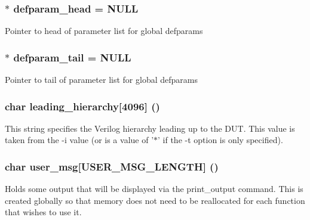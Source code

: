 \subsubsection{$\ast$ {\bf defparam\_\-head} = NULL}\label{param_8c_a0}


Pointer to head of parameter list for global defparams 
\subsubsection{$\ast$ {\bf defparam\_\-tail} = NULL}\label{param_8c_a1}


Pointer to tail of parameter list for global defparams 
\subsubsection{\setlength{\rightskip}{0pt plus 5cm}char {\bf leading\_\-hierarchy}[4096] ()}\label{param_8c_a3}


This string specifies the Verilog hierarchy leading up to the DUT. This value is taken from the -i value (or is a value of '$\ast$' if the -t option is only specified). 
\subsubsection{\setlength{\rightskip}{0pt plus 5cm}char {\bf user\_\-msg}[USER\_\-MSG\_\-LENGTH] ()}\label{param_8c_a2}


Holds some output that will be displayed via the print\_\-output command. This is created globally so that memory does not need to be reallocated for each function that wishes to use it. 